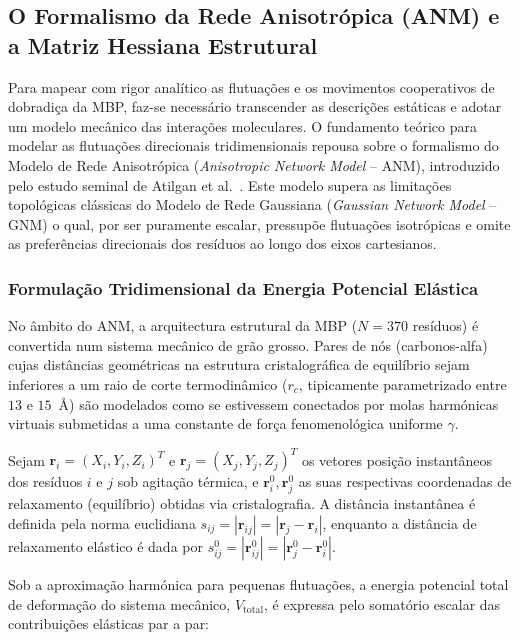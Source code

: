 \documentclass[12pt, a4paper]{article}
\begin{document}
\subsection{O Formalismo da Rede Anisotrópica (ANM) e a Matriz Hessiana Estrutural}
\label{sec:anm}

Para mapear com rigor analítico as flutuações e os movimentos cooperativos de dobradiça da MBP, faz-se necessário transcender as descrições estáticas e adotar um modelo mecânico das interações moleculares. O fundamento teórico para modelar as flutuações direcionais tridimensionais repousa sobre o formalismo do Modelo de Rede Anisotrópica (\textit{Anisotropic Network Model} -- ANM), introduzido pelo estudo seminal de Atilgan et al.~\cite{atilgan2001}. Este modelo supera as limitações topológicas clássicas do Modelo de Rede Gaussiana (\textit{Gaussian Network Model} -- GNM) o qual, por ser puramente escalar, pressupõe flutuações isotrópicas e omite as preferências direcionais dos resíduos ao longo dos eixos cartesianos.

\subsubsection{Formulação Tridimensional da Energia Potencial Elástica}

No âmbito do ANM, a arquitectura estrutural da MBP ($N = 370$ resíduos) é convertida num sistema mecânico de grão grosso. Pares de nós (carbonos-alfa) cujas distâncias geométricas na estrutura cristalográfica de equilíbrio sejam inferiores a um raio de corte termodinâmico ($r_c$, tipicamente parametrizado entre $13$ e $15$~\AA) são modelados como se estivessem conectados por molas harmónicas virtuais submetidas a uma constante de força fenomenológica uniforme $\gamma$.

Sejam $\mathbf{r}_i = (X_i, Y_i, Z_i)^T$ e $\mathbf{r}_j = (X_j, Y_j, Z_j)^T$ os vetores posição instantâneos dos resíduos $i$ e $j$ sob agitação térmica, e $\mathbf{r}_i^0, \mathbf{r}_j^0$ as suas respectivas coordenadas de relaxamento (equilíbrio) obtidas via cristalografia. A distância instantânea é definida pela norma euclidiana $s_{ij} = |\mathbf{r}_{ij}| = |\mathbf{r}_j - \mathbf{r}_i|$, enquanto a distância de relaxamento elástico é dada por $s_{ij}^0 = |\mathbf{r}_{ij}^0| = |\mathbf{r}_j^0 - \mathbf{r}_i^0|$. 

Sob a aproximação harmónica para pequenas flutuações, a energia potencial total de deformação do sistema mecânico, $V_{\text{total}}$, é expressa pelo somatório escalar das contribuições elásticas par a par:
\end{document}
